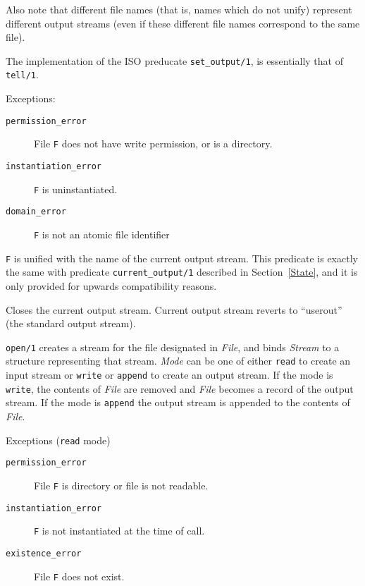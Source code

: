 \begin{description}
    Also note that different file names (that is, names which do not unify) 
    represent different output streams (even if these different file names 
    correspond to the same file).

    The implementation of the ISO preducate {\tt set\_output/1}, is
    essentially that of {\tt tell/1}.

    Exceptions:
    \begin {description}
    \item[{\tt permission\_error}]
	File {\tt F} does not have write permission, or is a directory.
    \item[{\tt instantiation\_error}]
	{\tt F} is uninstantiated.
    \item[{\tt domain\_error}]
    	{\tt F} is not an atomic file identifier
    \end{description}

    {\tt F} is unified with the name of the current output stream.
    This predicate is exactly the same with predicate {\tt current\_output/1}
    described in Section~\ref{State}, and it is only provided for
    upwards compatibility reasons.

    Closes the current output stream. 
    Current output stream reverts to ``userout'' (the standard output stream).

    {\tt open/1} creates a stream for the file designated in {\em
    File}, and binds {\em Stream} to a structure representing that
    stream.  {\em Mode} can be one of either {\tt read} to create an
    input stream or {\tt write} or {\tt append} to create an output
    stream.  If the mode is {\tt write}, the contents of {\em File}
    are removed and {\em File} becomes a record of the output stream.
    If the mode is {\tt append} the output stream is appended to the
    contents of {\em File}.

    Exceptions ({\tt read} mode)
    \begin{description}
    \item[{\tt permission\_error}]
    	File {\tt F} is directory or file is not readable. 
    \item[{\tt instantiation\_error}]
    	{\tt F} is not instantiated at the time of call. 
    \item[{\tt existence\_error}]
    	File {\tt F} does not exist. 
    \end{description}


\end{description}
